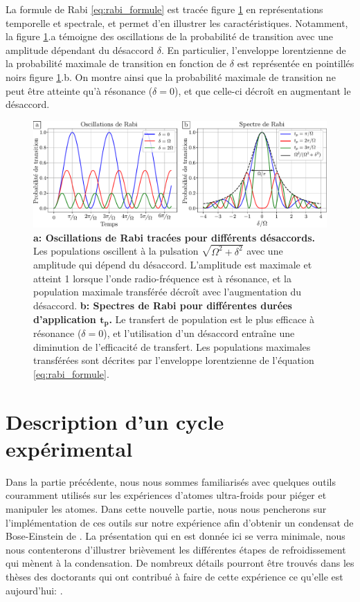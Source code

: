 La formule de Rabi \ref{eq:rabi_formule} est tracée figure \ref{fig:rabi} en représentations temporelle et spectrale, et permet d'en illustrer les caractéristiques. Notamment, la figure \ref{fig:rabi}.a témoigne des oscillations de la probabilité de transition avec une amplitude dépendant du désaccord $\delta$. 
En particulier, l'enveloppe lorentzienne de la probabilité maximale de transition en fonction de $\delta$ est représentée en pointillés noirs figure \ref{fig:rabi}.b. On montre ainsi que la probabilité maximale de transition ne peut être atteinte qu'à résonance ($\delta=0$), et que celle-ci décroît en augmentant le désaccord.

\begin{figure}
\centering
\includegraphics[width=\textwidth]{Fig/BEC_manip/rabi.pdf}
\caption{\textbf{a: Oscillations de Rabi tracées pour différents désaccords.} Les populations oscillent à la pulsation $\sqrt{\Omega^2+\delta^2}$ avec une amplitude qui dépend du désaccord. L'amplitude est maximale et atteint 1 lorsque l'onde radio-fréquence est à résonance, et la population maximale transférée décroît avec l'augmentation du désaccord. \textbf{b: Spectres de Rabi pour différentes durées d'application $\boldsymbol{t_p}$.} Le transfert de population est le plus efficace à résonance ($\delta=0$), et l'utilisation d'un désaccord entraîne une diminution de l'efficacité de transfert. Les populations maximales transférées sont décrites par l'enveloppe lorentzienne de l'équation \ref{eq:rabi_formule}.}
\label{fig:rabi}
\end{figure}






\section{Description d'un cycle expérimental}
Dans la partie précédente, nous nous sommes familiarisés avec quelques outils couramment utilisés sur les expériences d'atomes ultra-froids pour piéger et manipuler les atomes. Dans cette nouvelle partie, nous nous pencherons sur l'implémentation de ces outils sur notre expérience afin d'obtenir un condensat de Bose-Einstein de . La présentation qui en est donnée ici se verra minimale, nous nous contenterons d'illustrer brièvement les différentes étapes de refroidissement qui mènent à la condensation. De nombreux détails pourront être trouvés dans les thèses des doctorants qui ont contribué à faire de cette expérience ce qu'elle est aujourd'hui: \citep{fauquembergue2004realisation}\citep{riou2006etude}\citep{bernard2010transport}\citep{jendrzejewski2012quantum}\citep{muller2015coherent}\citep{denechaud2018vers}\citep{mukhtar2019state}.

